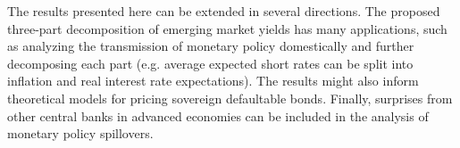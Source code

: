 {The results presented here can be extended in several directions.
The proposed three-part decomposition of emerging market yields has many applications, such as analyzing the transmission of monetary policy domestically and further decomposing each part (e.g. average expected short rates can be split into inflation and real interest rate expectations).
The results might also inform theoretical models for pricing sovereign defaultable bonds. 
Finally, surprises from other central banks in advanced economies can be included in the analysis of monetary policy spillovers. %





}
